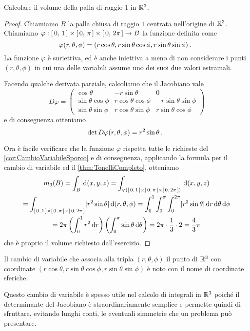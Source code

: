\begin{exercise}
	Calcolare il volume della palla di raggio $1$ in $\mathbb R^3$.
\end{exercise}
\begin{proof}
	Chiamiamo $B$ la palla chiusa di raggio $1$ centrata nell'origine di $\mathbb R^3$.
	Chiamiamo $\varphi:\left[\,0,\,1\,\right]\times\left[\,0,\,\pi\,\right]\times\left[\,0,\,2\pi\,\right]\to B$ la funzione definita come
	\begin{equation*}
		\varphi(r,\theta,\phi)=(r\cos\theta,r\sin\theta\cos\phi,r\sin\theta\sin\phi)\, \text{. }
	\end{equation*}
	La funzione $\varphi$ è suriettiva, ed è anche iniettiva a meno di non considerare i punti $(r,\theta,\phi)$ in cui una delle variabili assume uno dei suoi due valori estramali.
	
	Facendo qualche derivata parziale, calcoliamo che il Jacobiano vale
	\begin{equation*}
		D\varphi=
		\begin{pmatrix}
		\cos\theta 			&	-r\sin\theta		&	0						\\
		\sin\theta\cos\phi	&	r\cos\theta\cos\phi	&	-r\sin\theta\sin\phi	\\
		\sin\theta\sin\phi	&	r\cos\theta\sin\phi	&	r\sin\theta\cos\phi
		\end{pmatrix}
	\end{equation*}
	e di conseguenza otteniamo
	\begin{equation*}
		\det D\varphi(r,\theta,\phi)= r^2\sin\theta \, \text{. }
	\end{equation*}
	
	Ora è facile verificare che la funzione $\varphi$ rispetta tutte le richieste del \cref{cor:CambioVariabileSporco} e di conseguenza, applicando la formula per il cambio di variabile ed il \cref{thm:TonelliCompleto}, otteniamo
	\begin{multline*}
		m_3(B)=\int_B \,\mathrm d(x,y,z)=\int_{\varphi\left(\left[\,0,\,1\,\right]\times\left[\,0,\,\pi\,\right]\times\left[\,0,\,2\pi\,\right]\right)}\,\mathrm d(x,y,z)\\
		=\int_{\left[\,0,\,1\,\right]\times\left[\,0,\,\pi\,\right]\times\left[\,0,\,2\pi\,\right]} \lvert r^2\sin\theta\rvert\,\mathrm d(r,\theta,\phi)=\int_0^1\int_0^\pi\int_0^{2\pi}\lvert r^2\sin\theta\rvert\,\mathrm d r\,\mathrm d\theta\,\mathrm d\phi\\
		=2\pi\left(\int_0^1 r^2\,\mathrm d r\right)\left(\int_0^\pi\sin\theta\,\mathrm d\theta\right)=2\pi\cdot\frac 13\cdot 2=\frac 43\pi
	\end{multline*}
	che è proprio il volume richiesto dall'esercizio.
\end{proof}
\begin{remark}\label{nota:CoordinateSferiche}
	Il cambio di variabile che associa alla tripla $(r,\theta,\phi)$ il punto di $\mathbb R^3$ con coordinate $(r\cos\theta,r\sin\theta\cos\phi,r\sin\theta\sin\phi)$ è noto con il nome di coordinate sferiche.
	
	Questo cambio di variabile è spesso utile nel calcolo di integrali in $\mathbb R^3$ poiché il determinante del Jacobiano è straordinariamente semplice e permette quindi di sfruttare, evitando lunghi conti, le eventuali simmetrie che un problema può presentare.
\end{remark}


